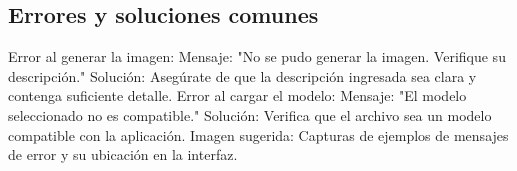 \subsection{Errores y soluciones comunes}

Error al generar la imagen:
Mensaje: "No se pudo generar la imagen. Verifique su descripción."
Solución: Asegúrate de que la descripción ingresada sea clara y contenga suficiente detalle.
Error al cargar el modelo:
Mensaje: "El modelo seleccionado no es compatible."
Solución: Verifica que el archivo sea un modelo compatible con la aplicación.
Imagen sugerida: Capturas de ejemplos de mensajes de error y su ubicación en la interfaz.